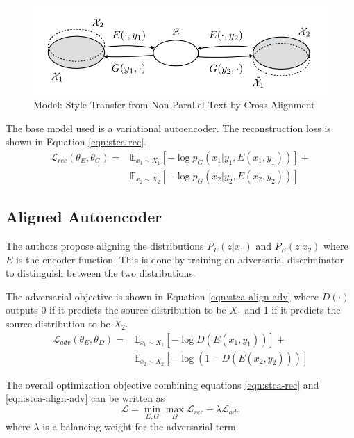 \begin{figure}[ht]
	\centering
	\includegraphics[width=\textwidth]{images/stca-architecture}
	\caption{\label{fig:stca-architecture} Model: Style Transfer from Non-Parallel Text by Cross-Alignment}
\end{figure}

The base model used is a variational autoencoder. The reconstruction loss is shown in Equation \ref{eqn:stca-rec}.
\begin{align} \label{eqn:stca-rec}
	\mathcal{L}_{rec}(\theta_E,\theta_G) =
	 & \mathbb{E}_{x_1 \sim X_1}[-\log p_G(x_1|y_1,E(x_1, y_1))] + \nonumber \\
	 & \mathbb{E}_{x_2 \sim X_2}[-\log p_G(x_2|y_2,E(x_2, y_2))]
\end{align}

\subsection{Aligned Autoencoder}

The authors propose aligning the distributions $P_E(z|x_1)$ and $P_E(z|x_2)$ where $E$ is the encoder function. This is done by training an adversarial discriminator to distinguish between the two distributions.

The adversarial objective is shown in Equation \ref{eqn:stca-align-adv} where $D(\cdot)$ outputs 0 if it predicts the source distribution to be $X_1$ and 1 if it predicts the source distribution to be $X_2$.
\begin{align} \label{eqn:stca-align-adv}
	\mathcal{L}_{adv}(\theta_E,\theta_D) =
	 & \mathbb{E}_{x_1 \sim X_1}[-\log D(E(x_1,y_1))] + \nonumber \\
	 & \mathbb{E}_{x_2 \sim X_2}[-\log(1 - D(E(x_2,y_2)))]
\end{align}

The overall optimization objective combining equations \ref{eqn:stca-rec} and \ref{eqn:stca-align-adv} can be written as
\begin{equation}
	\mathcal{L} = \operatorname*{min}_{E,G} \operatorname*{max}_{D} \mathcal{L}_{rec} - \lambda \mathcal{L}_{adv}
\end{equation}
where $\lambda$ is a balancing weight for the adversarial term.

